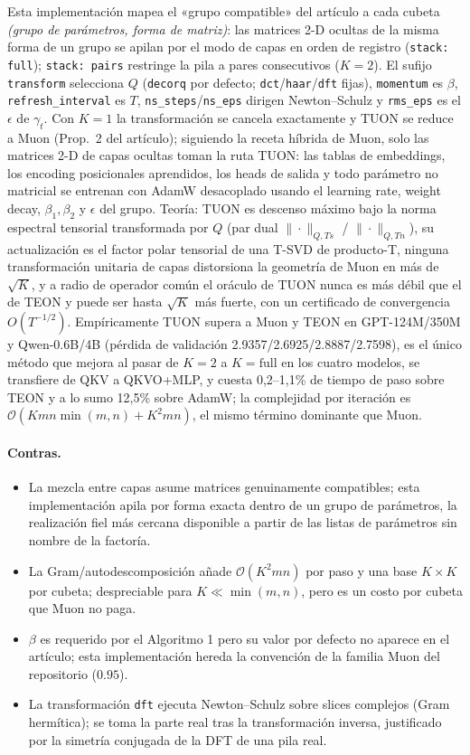 Esta implementación mapea el «grupo compatible» del artículo a cada cubeta
\emph{(grupo de parámetros, forma de matriz)}: las matrices 2-D ocultas de la misma forma
de un grupo se apilan por el modo de capas en orden de registro (\texttt{stack: full});
\texttt{stack: pairs} restringe la pila a pares consecutivos ($K=2$). El sufijo
\texttt{transform} selecciona $Q$ (\texttt{decorq} por defecto;
\texttt{dct}/\texttt{haar}/\texttt{dft} fijas), \texttt{momentum} es $\beta$,
\texttt{refresh\_interval} es $T$, \texttt{ns\_steps}/\texttt{ns\_eps} dirigen
Newton--Schulz y \texttt{rms\_eps} es el $\epsilon$ de $\gamma_t$. Con $K=1$ la
transformación se cancela exactamente y TUON se reduce a Muon (Prop.~2 del artículo);
siguiendo la receta híbrida de Muon, solo las matrices 2-D de capas ocultas toman la ruta
TUON: las tablas de embeddings, los encoding posicionales aprendidos, los heads de salida
y todo parámetro no matricial se entrenan con AdamW desacoplado usando el learning rate,
weight decay, $\beta_1, \beta_2$ y $\epsilon$ del grupo. Teoría: TUON es descenso máximo
bajo la norma espectral tensorial transformada por $Q$ (par dual
$\|\cdot\|_{Q,Ts}$ / $\|\cdot\|_{Q,Tn}$), su actualización es el factor polar tensorial
de una T-SVD de producto-T, ninguna transformación unitaria de capas distorsiona la
geometría de Muon en más de $\sqrt{K}$, y a radio de operador común el oráculo de TUON
nunca es más débil que el de TEON y puede ser hasta $\sqrt{K}$ más fuerte, con un
certificado de convergencia $O(T^{-1/2})$. Empíricamente TUON supera a Muon y TEON en
GPT-124M/350M y Qwen-0.6B/4B (pérdida de validación 2.9357/2.6925/2.8887/2.7598), es el
único método que mejora al pasar de $K{=}2$ a $K{=}\mathrm{full}$ en los cuatro modelos,
se transfiere de QKV a QKVO+MLP, y cuesta 0,2--1,1\% de tiempo de paso sobre TEON y a lo
sumo 12,5\% sobre AdamW; la complejidad por iteración es
$\mathcal{O}(Kmn\min(m,n) + K^2 mn)$, el mismo término dominante que Muon.

\paragraph{Contras.}
\begin{itemize}[leftmargin=*]
\item La mezcla entre capas asume matrices genuinamente compatibles; esta implementación
  apila por forma exacta dentro de un grupo de parámetros, la realización fiel más
  cercana disponible a partir de las listas de parámetros sin nombre de la factoría.
\item La Gram/autodescomposición añade $\mathcal{O}(K^2 mn)$ por paso y una base
  $K \times K$ por cubeta; despreciable para $K \ll \min(m, n)$, pero es un costo por
  cubeta que Muon no paga.
\item $\beta$ es requerido por el Algoritmo 1 pero su valor por defecto no aparece en el
  artículo; esta implementación hereda la convención de la familia Muon del repositorio
  ($0.95$).
\item La transformación \texttt{dft} ejecuta Newton--Schulz sobre slices complejos
  (Gram hermítica); se toma la parte real tras la transformación inversa, justificado por
  la simetría conjugada de la DFT de una pila real.
\end{itemize}

